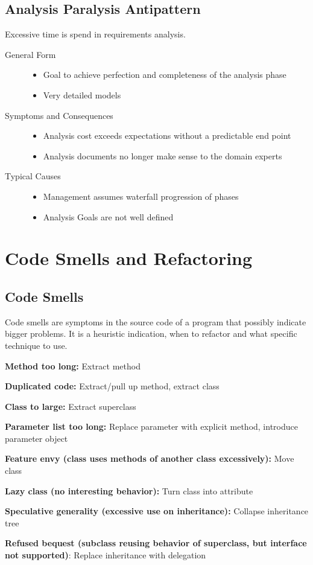 \subsection{Analysis Paralysis Antipattern}
Excessive time is spend in requirements analysis.
\begin{description}
  \item[General Form] \hfill
  \begin{itemize}
    \item Goal to achieve perfection and completeness of the analysis phase
    \item Very detailed models
  \end{itemize}
  \item[Symptoms and Consequences] \hfill
  \begin{itemize}
    \item Analysis cost exceeds expectations without a predictable end point
    \item Analysis documents no longer make sense to the domain experts
  \end{itemize}
  \item[Typical Causes] \hfill
  \begin{itemize}
    \item Management assumes waterfall progression of phases
    \item Analysis Goals are not well defined
  \end{itemize}
\end{description}
\newpage

\section{Code Smells and Refactoring}
\subsection{Code Smells}
Code smells are symptoms in the source code of a program that possibly indicate bigger problems. It is a heuristic indication, when to refactor and what specific technique to use.
\begin{description}[]
  \item \textbf{Method too long:} Extract method
  \item \textbf{Duplicated code:} Extract/pull up method, extract class
  \item \textbf{Class to large:} Extract superclass
  \item \textbf{Parameter list too long:} Replace parameter with explicit method, introduce parameter object
  \item \textbf{Feature envy (class uses methods of another class excessively):} Move class
  \item \textbf{Lazy class (no interesting behavior):} Turn class into attribute 
  \item \textbf{Speculative generality (excessive use on inheritance):} Collapse inheritance tree
  \item \textbf{Refused bequest (subclass reusing behavior of superclass, but interface not supported)}: Replace inheritance with delegation
\end{description}
\newpage

